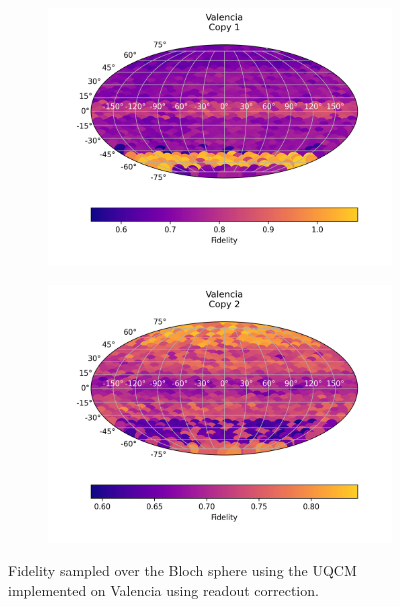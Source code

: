 \begin{figure}[H]
    \centering
    \begin{subfigure}{.5\textwidth}
      \centering
      \includegraphics[width=\textwidth]{Figures/UQCM/IBM/FullSphere/results_corrected_valencia_copy1.png}
    \end{subfigure}%
    \begin{subfigure}{.5\textwidth}
      \centering
      \includegraphics[width=\textwidth]{Figures/UQCM/IBM/FullSphere/results_corrected_valencia_copy2.png}
    \end{subfigure}
    \caption{Fidelity sampled over the Bloch sphere using the UQCM implemented on Valencia using readout correction.}
    \label{fig:uqcm_valencia}
\end{figure}



